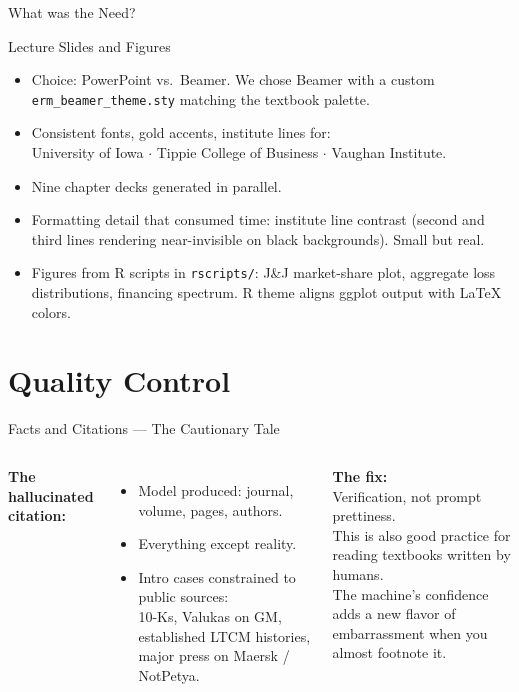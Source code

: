 \documentclass[11pt, aspectratio=169]{beamer}
\begin{document}
\begin{frame}{What was the Need?}
\begin{frame}{Lecture Slides and Figures}
\begin{itemize}
  \item Choice: PowerPoint vs.\ Beamer. We chose Beamer with a custom
        \texttt{erm\_beamer\_theme.sty} matching the textbook palette.
  \item Consistent fonts, gold accents, institute lines for:\\
        University of Iowa $\cdot$ Tippie College of Business $\cdot$
        Vaughan Institute.
  \item Nine chapter decks generated in parallel.
  \item Formatting detail that consumed time: institute line contrast
        (second and third lines rendering near-invisible on black backgrounds).
        Small but real.
  \item Figures from R scripts in \texttt{rscripts/}: J\&J market-share plot,
        aggregate loss distributions, financing spectrum.
        R theme aligns ggplot output with \LaTeX{} colors.
\end{itemize}
\end{frame}

\section{Quality Control}

\begin{frame}{Facts and Citations --- The Cautionary Tale}
\begin{columns}[T]
\textbf{The hallucinated citation:}
\begin{itemize}
  \item Model produced: journal, volume, pages, authors.
  \item Everything except reality.
  \item Intro cases constrained to public sources:\\
        10-Ks, Valukas on GM, established LTCM histories,
        major press on Maersk / NotPetya.
\end{itemize}
\textbf{The fix:}\\[6pt]
Verification, not prompt prettiness.\\[12pt]
\alert{This is also good practice for reading textbooks written by humans.}\\[6pt]
The machine's confidence adds a new flavor of embarrassment
when you almost footnote it.
\end{columns}
\end{frame}


\end{frame}
\end{document}
